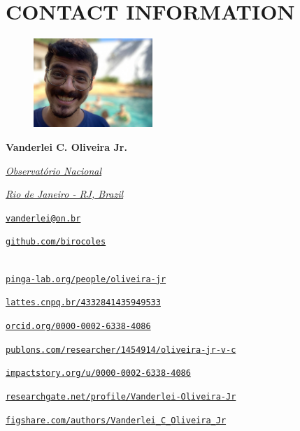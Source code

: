 \documentclass[11pt,a4paper,onecolumn]{article}
\begin{document}
	
\section*{CONTACT INFORMATION}

{

\begin{figure} 
	\centering
	\includegraphics[width=0.40\textwidth,angle=-90]{foto.jpg}
\end{figure}

\parbox{0.03\textwidth}{\faUser} \textbf{Vanderlei C. Oliveira Jr.}\\
\parbox{0.03\textwidth}{\faInstitution} \href{https://www.gov.br/observatorio/pt-br}{\textit{Observatório Nacional}}\\
\parbox{0.03\textwidth}{\faMapMarker} \href{https://g.page/observatorionacional?share}{\textit{Rio de Janeiro - RJ, Brazil}}\\
\parbox{0.03\textwidth}{\faEnvelope} \href{mailto:vanderlei@on.br}{\texttt{vanderlei@on.br}}\\
\parbox{0.03\textwidth}{\faGithub} \href{https://github.com/birocoles}{\footnotesize \texttt{github.com/birocoles}}\\\\
\parbox{0.03\textwidth}{\faGroup} \href{https://www.pinga-lab.org/people/oliveira-jr.html}{\footnotesize \texttt{pinga-lab.org/people/oliveira-jr}}\\
\parbox{0.03\textwidth}{\aiLattes} \href{https://lattes.cnpq.br/4332841435949533}{\footnotesize \texttt{lattes.cnpq.br/4332841435949533}}\\
\parbox{0.03\textwidth}{\aiOrcid} \href{https://orcid.org/0000-0002-6338-4086}{\footnotesize \texttt{orcid.org/0000-0002-6338-4086}}\\
\parbox{0.03\textwidth}{\aiPublonsSquare} \href{https://publons.com/researcher/1454914/oliveira-jr-v-c/}{\footnotesize  \texttt{publons.com/researcher/1454914/oliveira-jr-v-c}}\\
\parbox{0.03\textwidth}{\aiImpactstory} \href{https://impactstory.org/u/0000-0002-6338-4086}{\footnotesize \texttt{impactstory.org/u/0000-0002-6338-4086}}\\
\parbox{0.03\textwidth}{\aiResearchGateSquare} \href{https://www.researchgate.net/profile/Vanderlei-Oliveira-Jr}{\footnotesize \texttt{researchgate.net/profile/Vanderlei-Oliveira-Jr}}\\
\parbox{0.03\textwidth}{\aiFigshare} \href{https://figshare.com/authors/Vanderlei_C_Oliveira_Jr/387579}{\footnotesize \texttt{figshare.com/authors/Vanderlei{\_}C{\_}Oliveira{\_}Jr}}\\

} %
\end{document}
